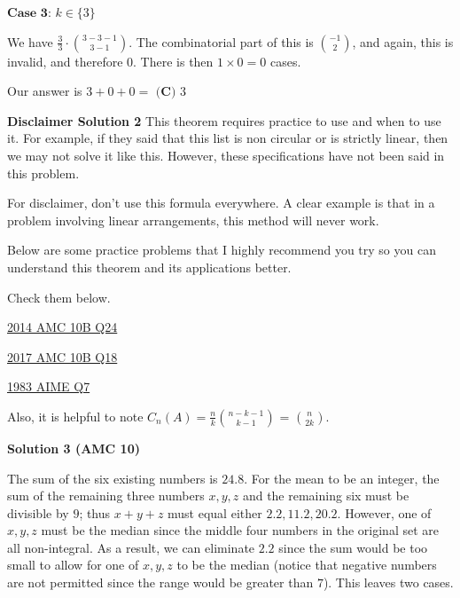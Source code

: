 \begin{enumerate}
 $\textbf{Case 3:}$ $k \in \{3\}$

 We have \( \frac{3}{3} \cdot \binom{3-3-1}{3-1} \). The combinatorial part of this is \( \binom{-1}{2} \), and again, this is invalid, and therefore 0. There is then \( 1 \times 0 = 0 \) cases.

 Our answer is \( 3 + 0 + 0 =  \) $\boxed{\textbf{(C) }3}$

 \textbf{Disclaimer Solution 2} This theorem requires practice to use and when to use it. For example, if they said that this list is non circular or is strictly linear, then we may not solve it like this. However, these specifications have not been said in this problem.

 For disclaimer, don't use this formula everywhere. A clear example is that in a problem involving linear arrangements, this method will never work.

 Below are some practice problems that I highly recommend you try so you can understand this theorem and its applications better.

 Check them below.

 \href{https://artofproblemsolving.com/wiki/index.php/2014\_AMC\_10B\_Problems/Problem\_24}{2014 AMC 10B Q24}

 \href{https://artofproblemsolving.com/wiki/index.php/2017\_AMC\_10B\_Problems/Problem\_18?srsltid=AfmBOoorbWvdWI5mJYkf\_XsGNK8N7JEX7G2S4w13Uy\_lkqkFIXMbqJQc}{2017 AMC 10B Q18}

 \href{https://artofproblemsolving.com/wiki/index.php/1983\_AIME\_Problems/Problem\_7?srsltid=AfmBOoo2Rma8yq6kbV0holdmtaa2Zr2ezKPOD6cPyGa0Xs8GcMtwEf3J}{1983 AIME Q7}

 Also, it is helpful to note \( C_n(A) = \frac{n}{k} \binom{n-k-1}{k-1} \) = \( \binom{n}{2k} \).

 



\textbf{Solution 3 (AMC 10)}

The sum of the six existing numbers is $24.8$. For the mean to be an integer, the sum of the remaining three numbers $x,y,z$ and the remaining six must be divisible by $9$; thus $x+y+z$ must equal either $2.2,11.2,20.2$. However, one of $x,y,z$ must be the median since the middle four numbers in the original set are all non-integral. As a result, we can eliminate $2.2$ since the sum would be too small to allow for one of $x,y,z$ to be the median (notice that negative numbers are not permitted since the range would be greater than $7$). This leaves two cases.


\end{enumerate}

